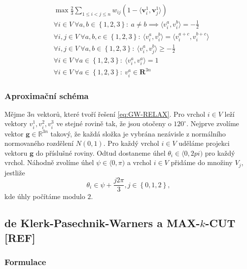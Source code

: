 \begin{equation}\tag{GW-RELAX}
    \begin{split}
        &\max \frac{2}{3} \sum_{1 \leq i < j \leq n} w_{ij} (1 - \langle \mathbf{v}_i^1, \mathbf{v}_j^1 \rangle) \\
        &\forall i \in V\ \forall a,b \in \left\{ 1,2,3 \right\}:\ a \neq b \implies \langle v_i^a, v_i^b \rangle = -\frac{1}{2} \\
        &\forall i,j \in V\ \forall a,b,c \in \left\{ 1,2,3 \right\}:\ \langle v_i^a, v_i^b \rangle = \langle v_i^{a+c}, v_i^{b+c} \rangle \\
        &\forall i,j \in V\ \forall a,b \in \left\{ 1,2,3 \right\}:\ \langle v_i^a, v_j^b \rangle \geq -\frac{1}{2} \\
        &\forall i \in V\ \forall a \in \left\{ 1,2,3 \right\}:\ \langle v_i^a, v_i^a \rangle = 1 \\
        &\forall i \in V\ \forall a \in \left\{ 1,2,3 \right\}:\ v_i^a \in \mathbf{R}^{3n}
    \end{split}
    \label{eq:GW-RELAX}
\end{equation}

\subsubsection*{Aproximační schéma}

Mějme $3n$ vektorů, které tvoří řešení \ref{eq:GW-RELAX}. Pro vrchol $i \in V$ leží vektory $v_i^1, v_i^2, v_i^3$ ve stejné rovině tak, že jsou otočeny o $120^{\circ}$. Nejprve zvolíme vektor $\mathbf{g} \in \mathbb{R}^{3n}$ takový, že každá složka je vybrána nezávisle z normálního normovaného rozdělení $N(0,1)$. Pro každý vrchol $i \in V$ uděláme projekci vektoru $\mathbf{g}$ do příslušné roviny. Odtud dostaneme úhel $\theta_i \in \langle 0, 2pi)$ pro každý vrchol. Náhodně zvolíme úhel $\psi \in \langle 0, \pi)$ a vrchol $i \in V$ přidáme do množiny $V_j$, jestliže
$$
    \theta_i \in \psi + \frac{j 2 \pi}{3}, j \in \left\{ 0, 1, 2 \right\},
$$
kde úhly počítáme modulo $2$.

\subsection{de Klerk-Pasechnik-Warners a MAX-$k$-CUT \textbf{[REF]}}

\subsubsection*{Formulace}

